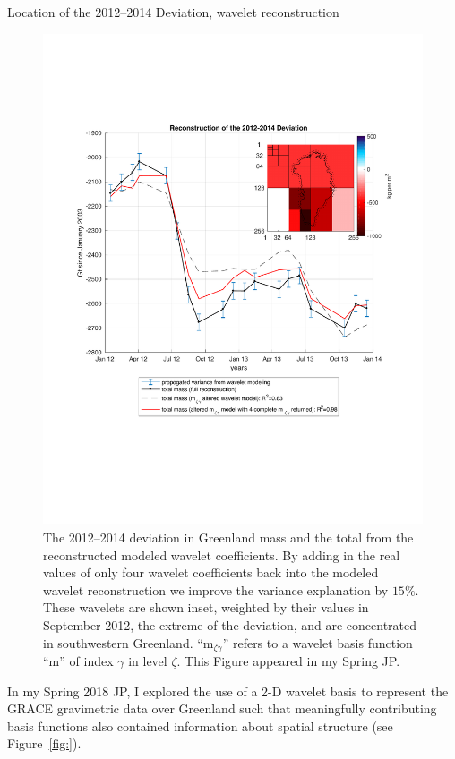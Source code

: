 \documentclass[11pt]{report}
\begin{document}
Location of the 2012--2014 Deviation, wavelet reconstruction
\begin{figure} 
\vspace{-50pt}
\includegraphics[width=\linewidth]{Figures/deviant.pdf}
\caption[Location of the 2012--2014 Deviation]{The 2012--2014 deviation in Greenland mass and the total from the reconstructed modeled wavelet coefficients. By adding in the real values of only four wavelet coefficients back into the modeled wavelet reconstruction we improve the variance explanation by $15\%$. These wavelets are shown inset, weighted by their values in September 2012, the extreme of the deviation, and are concentrated in southwestern Greenland. ``m$_{\zeta\gamma}$'' refers to a wavelet basis function ``m'' of index $\gamma$ in level $\zeta$. This Figure appeared in my Spring JP.
\label{fig:deviant}}
\end{figure}

In my Spring 2018 JP, I explored the use of a 2-D wavelet basis to represent the GRACE gravimetric data over Greenland such that meaningfully contributing basis functions also contained information about spatial structure (see
Figure~\ref{fig:}). 
\end{document}
